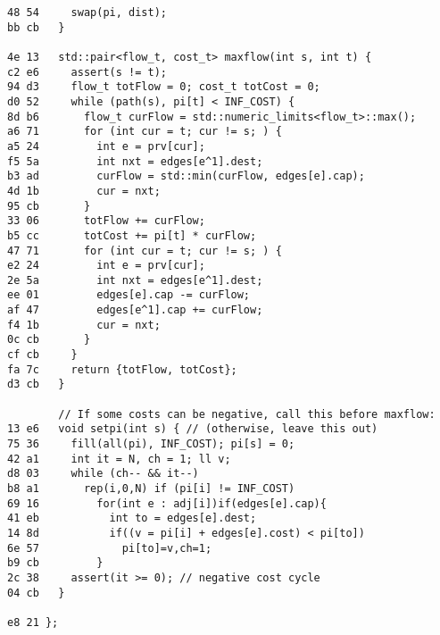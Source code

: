 \documentclass[11pt, a4paper, twoside]{article}
\begin{document}
\begin{lstlisting}
48 54     swap(pi, dist);
bb cb   }
      
4e 13   std::pair<flow_t, cost_t> maxflow(int s, int t) {
c2 e6     assert(s != t);
94 d3     flow_t totFlow = 0; cost_t totCost = 0;
d0 52     while (path(s), pi[t] < INF_COST) {
8d b6       flow_t curFlow = std::numeric_limits<flow_t>::max();
a6 71       for (int cur = t; cur != s; ) {
a5 24         int e = prv[cur];
f5 5a         int nxt = edges[e^1].dest;
b3 ad         curFlow = std::min(curFlow, edges[e].cap);
4d 1b         cur = nxt;
95 cb       }
33 06       totFlow += curFlow;
b5 cc       totCost += pi[t] * curFlow;
47 71       for (int cur = t; cur != s; ) {
e2 24         int e = prv[cur];
2e 5a         int nxt = edges[e^1].dest;
ee 01         edges[e].cap -= curFlow;
af 47         edges[e^1].cap += curFlow;
f4 1b         cur = nxt;
0c cb       }
cf cb     }
fa 7c     return {totFlow, totCost};
d3 cb   }
      
        // If some costs can be negative, call this before maxflow:
13 e6   void setpi(int s) { // (otherwise, leave this out)
75 36     fill(all(pi), INF_COST); pi[s] = 0;
42 a1     int it = N, ch = 1; ll v;
d8 03     while (ch-- && it--)
b8 a1       rep(i,0,N) if (pi[i] != INF_COST)
69 16         for(int e : adj[i])if(edges[e].cap){
41 eb           int to = edges[e].dest;
14 8d           if((v = pi[i] + edges[e].cost) < pi[to])
6e 57             pi[to]=v,ch=1;
b9 cb         }
2c 38     assert(it >= 0); // negative cost cycle
04 cb   }
      
e8 21 };
\end{lstlisting}
\end{document}
